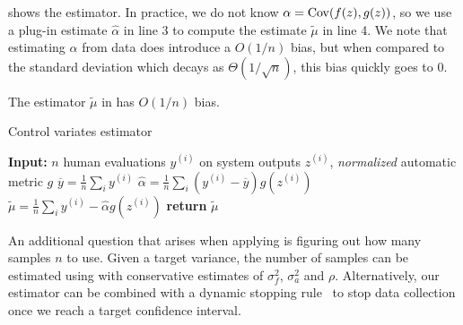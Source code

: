  shows the estimator.
In practice, we do not know $\alpha = \operatorname{Cov}(f(z),g(z))$, so we use a plug-in estimate $\hat{\alpha}$ in line 3 to compute the estimate $\widetilde{\mu}$ in line 4.
We note that estimating $\alpha$ from data does introduce a $O(1/n)$ bias,
but when compared to the standard deviation which decays as $\Theta(1/\sqrt{n})$, this bias quickly goes to $0$.

\begin{proposition}
\label{prop:price:added_bias}
The estimator $\widetilde{\mu}$ in  has $O(1/n)$ bias.
\end{proposition}

\begin{algorithm}
      \caption{\label{alg:price:estimate}Control variates estimator}
      \begin{algorithmic}[1]
   \State{} {\bfseries Input:} $n$ human evaluations $y^{(i)}$ on system outputs $z^{(i)}$, \textit{normalized} automatic metric $g$ 
   \State{} $\overline{y} = \frac{1}{n} \sum_i y^{(i)}$
   \State{} $\hat{\alpha} = \frac{1}{n} \sum_i (y^{(i)} - \overline{y}) g(z^{(i)})$
   \State{} $\widetilde{\mu} = \frac{1}{n} \sum_i y^{(i)} - \hat{\alpha} g(z^{(i)})$
   \State{} {\bfseries return} $\widetilde{\mu}$
\end{algorithmic}
\end{algorithm}

An additional question that arises when applying  is figuring out how many samples $n$ to use.
Given a target variance, the number of samples can be estimated using  with conservative estimates of $\sigma^2_f$, $\sigma^2_a$ and $\rho$.
Alternatively, our estimator can be combined with a dynamic stopping rule~\citep{mnih2008empirical} to stop data collection once we reach a target confidence interval.

